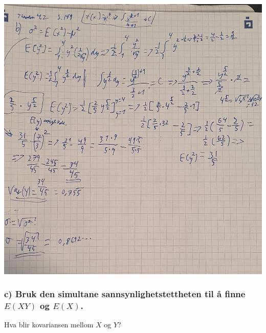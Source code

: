 \documentclass[
  12pt,
  a4paper,
  DIV=11,
  numbers=noendperiod]{scrartcl}
\begin{document}
\includegraphics{oblig2_utregning/oppgave1_b.jpg}

\subsubsection{\texorpdfstring{c) Bruk den simultane
sannsynlighetstettheten til å finne \(E(XY)\) og
\(E(X)\).}{c) Bruk den simultane sannsynlighetstettheten til å finne E(XY) og E(X).}}\label{c-bruk-den-simultane-sannsynlighetstettheten-til-uxe5-finne-exy-og-ex.}

Hva blir kovariansen mellom \(X\) og \(Y\)?
\end{document}
